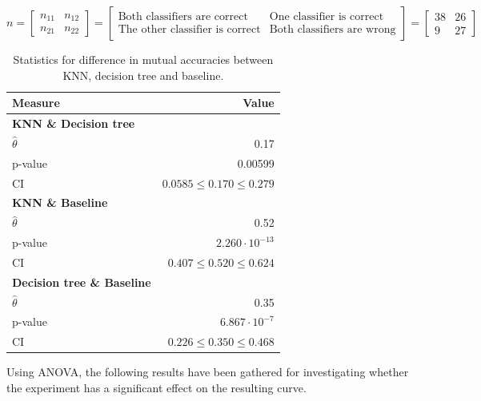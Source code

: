 \documentclass[11pt, fleqn, titlepage]{article}
\begin{document}
\[n = \begin{bmatrix} n_{11} & n_{12} \\ n_{21} & n_{22} \end{bmatrix} = \begin{bmatrix} \text{Both classifiers are correct} & \text{One classifier is correct} \\ \text{The other classifier is correct} & \text{Both classifiers are wrong} \end{bmatrix} = \begin{bmatrix} 38 & 26 \\ 9 & 27 \end{bmatrix}\] 

\begin{table}[H]
	\centering
	\begin{tabular}{l r}
		\toprule
		Measure        & Value                          \\ \midrule

		\textbf{KNN \& Decision tree} &                 \\		
		$\hat{\theta}$ & 0.17                           \\ 
		p-value        & 0.00599                        \\ 
		CI             & $0.0585 \leq 0.170 \leq 0.279$ \\ \midrule

		\textbf{KNN \& Baseline} &                      \\		
		$\hat{\theta}$ & 0.52                           \\ 
		p-value        & $2.260 \cdot 10^{-13}$      \\ 
		CI             & $0.407 \leq 0.520 \leq 0.624$ \\ \midrule
		
		\textbf{Decision tree \& Baseline} &            \\
		$\hat{\theta}$ & 0.35                           \\ 
		p-value        & $6.867 \cdot 10^{-7}$       \\ 
		CI             & $0.226 \leq 0.350 \leq 0.468$ \\ \bottomrule
		
	\end{tabular}
\caption{Statistics for difference in mutual accuracies between KNN, decision tree and baseline.}
\label{measuresKNNDT}
\end{table}

\noindent Using ANOVA, the following results have been gathered for investigating whether the experiment has a significant effect on the resulting curve.
\end{document}
